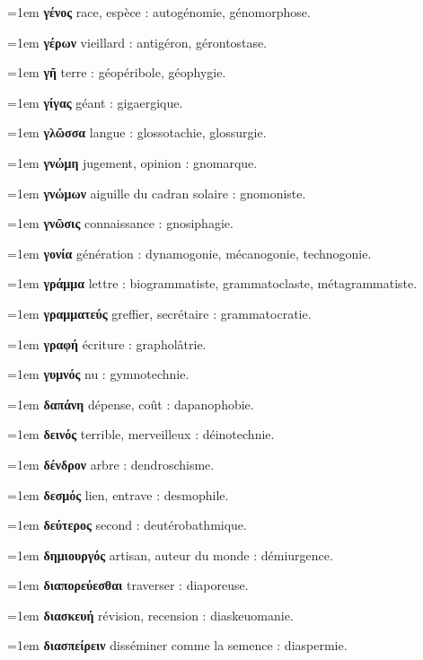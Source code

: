 \hangindent=1em \textbf{γένος} race, espèce : autogénomie, génomorphose.\par
\hangindent=1em \textbf{γέρων} vieillard : antigéron, gérontostase.\par
\hangindent=1em \textbf{γῆ} terre : géopéribole, géophygie.\par
\hangindent=1em \textbf{γίγας} géant : gigaergique.\par
\hangindent=1em \textbf{γλῶσσα} langue : glossotachie, glossurgie.\par
\hangindent=1em \textbf{γνώμη} jugement, opinion : gnomarque.\par
\hangindent=1em \textbf{γνώμων} aiguille du cadran solaire : gnomoniste.\par
\hangindent=1em \textbf{γνῶσις} connaissance : gnosiphagie.\par
\hangindent=1em \textbf{γονία} génération : dynamogonie, mécanogonie, technogonie.\par
\hangindent=1em \textbf{γράμμα} lettre : biogrammatiste, grammatoclaste, métagrammatiste.\par
\hangindent=1em \textbf{γραμματεύς} greffier, secrétaire : grammatocratie.\par
\hangindent=1em \textbf{γραφή} écriture : grapholâtrie.\par
\hangindent=1em \textbf{γυμνός} nu : gymnotechnie.\par
\hangindent=1em \textbf{δαπάνη} dépense, coût : dapanophobie.\par
\hangindent=1em \textbf{δεινός} terrible, merveilleux : déinotechnie.\par
\hangindent=1em \textbf{δένδρον} arbre : dendroschisme.\par
\hangindent=1em \textbf{δεσμός} lien, entrave : desmophile.\par
\hangindent=1em \textbf{δεύτερος} second : deutérobathmique.\par
\hangindent=1em \textbf{δημιουργός} artisan, auteur du monde : démiurgence.\par
\hangindent=1em \textbf{διαπορεύεσθαι} traverser : diaporeuse.\par
\hangindent=1em \textbf{διασκευή} révision, recension : diaskeuomanie.\par
\hangindent=1em \textbf{διασπείρειν} disséminer comme la semence : diaspermie.\par
